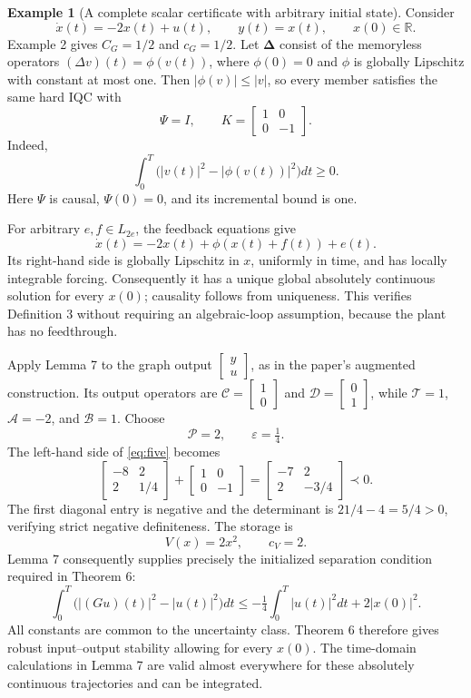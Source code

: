 \documentclass[10pt,twocolumn,letterpaper]{article}
\theoremstyle{definition}
\newtheorem{example}{Example}
\theoremstyle{plain}
\newcommand{\col}[1]{\begin{bmatrix}#1\end{bmatrix}}
\newcommand{\TT}{\mathcal T}
\newcommand{\opA}{\mathcal A}
\newcommand{\opB}{\mathcal B}
\newcommand{\opC}{\mathcal C}
\newcommand{\opD}{\mathcal D}
\newcommand{\opP}{\mathcal P}
\begin{document}
\begin{example}[A complete scalar certificate with arbitrary initial state]
Consider
\[
 \dot x(t)=-2x(t)+u(t),\qquad y(t)=x(t),\qquad x(0)\in\mathbb R.
\]
Example 2 gives $C_G=1/2$ and $c_G=1/2$. Let
$\boldsymbol\Delta$ consist of the memoryless operators
$(\Delta v)(t)=\phi(v(t))$, where $\phi(0)=0$ and $\phi$ is globally
Lipschitz with constant at most one. Then $|\phi(v)|\leq|v|$, so every
member satisfies the same hard IQC with
\[
 \Psi=I,\qquad K=\col{1&0\\0&-1}.
\]
Indeed,
\[
 \int_0^T\bigl(|v(t)|^2-|\phi(v(t))|^2\bigr)dt\geq0.
\]
Here $\Psi$ is causal, $\Psi(0)=0$, and its incremental bound is one.

For arbitrary $e,f\in L_{2e}$, the feedback equations give
\[
 \dot x(t)=-2x(t)+\phi(x(t)+f(t))+e(t).
\]
Its right-hand side is globally Lipschitz in $x$, uniformly in time,
and has locally integrable forcing. Consequently it has a unique
global absolutely continuous solution for every $x(0)$; causality
follows from uniqueness. This verifies Definition 3 without requiring
an algebraic-loop assumption, because the plant has no feedthrough.

Apply Lemma 7 to the graph output $\col{y\\u}$, as in the paper's
augmented construction. Its output operators are
$\opC=\col{1\\0}$ and $\opD=\col{0\\1}$, while
$\TT=1$, $\opA=-2$, and $\opB=1$. Choose
\[
 \opP=2,\qquad \varepsilon=\tfrac14.
\]
The left-hand side of \eqref{eq:five} becomes
\[
 \col{-8&2\\2&1/4}+\col{1&0\\0&-1}
 =\col{-7&2\\2&-3/4}\prec0.
\]
The first diagonal entry is negative and the determinant is
$21/4-4=5/4>0$, verifying strict negative definiteness. The storage is
\[
 V(x)=2x^2,\qquad c_V=2.
\]
Lemma 7 consequently supplies precisely the initialized separation
condition required in Theorem 6:
\[
 \int_0^T\bigl(|(Gu)(t)|^2-|u(t)|^2\bigr)dt
 \leq-\tfrac14\int_0^T|u(t)|^2dt+2|x(0)|^2.
\]
All constants are common to the uncertainty class. Theorem 6 therefore
gives robust input--output stability allowing for every $x(0)$.
The time-domain calculations in Lemma 7 are valid almost everywhere
for these absolutely continuous trajectories and can be integrated.
\end{example}
\end{document}
